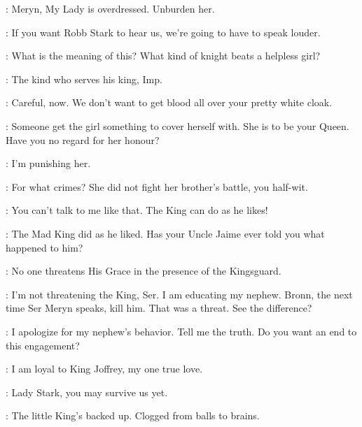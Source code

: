 \JOFFREY: Meryn, My Lady is overdressed. Unburden her. 


\JOFFREY: If you want Robb Stark to hear us, we're going to have to speak louder. 



\TYRION: What is the meaning of this? What kind of knight beats a helpless girl? 

\MERYN: The kind who serves his king, Imp. 

\BRONN: Careful, now. We don't want to get blood all over your pretty white cloak. 

\TYRION: Someone get the girl something to cover herself with. She is to be your Queen. Have you no regard for her honour? 


\JOFFREY: I'm punishing her. 

\TYRION: For what crimes? She did not fight her brother's battle, you half-wit. 

\JOFFREY: You can't talk to me like that. The King can do as he likes! 

\TYRION: The Mad King did as he liked. Has your Uncle Jaime ever told you what happened to him? 

\MERYN: No one threatens His Grace in the presence of the Kingsguard. 

\TYRION: I'm not threatening the King, Ser. I am educating my nephew. Bronn, the next time Ser Meryn speaks, kill him. That was a threat. See the difference? 


\TYRION: I apologize for my nephew's behavior. Tell me the truth. Do you want an end to this engagement? 

\SANSA: I am loyal to King Joffrey, my one true love. 


\TYRION: Lady Stark, you may survive us yet. 


\BRONN: The little King's backed up. Clogged from balls to brains. 

